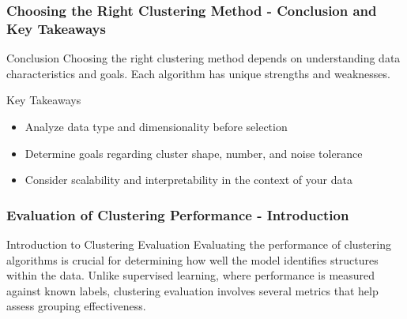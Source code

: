 \documentclass[aspectratio=169]{beamer}
\begin{document}
\begin{frame}[fragile]
    \frametitle{Choosing the Right Clustering Method - Conclusion and Key Takeaways}
    \begin{block}{Conclusion}
        Choosing the right clustering method depends on understanding data characteristics and goals. Each algorithm has unique strengths and weaknesses.
    \end{block}
    
    \begin{block}{Key Takeaways}
        \begin{itemize}
            \item Analyze data type and dimensionality before selection
            \item Determine goals regarding cluster shape, number, and noise tolerance
            \item Consider scalability and interpretability in the context of your data
        \end{itemize}
    \end{block}
\end{frame}

\begin{frame}[fragile]
    \frametitle{Evaluation of Clustering Performance - Introduction}
    \begin{block}{Introduction to Clustering Evaluation}
        Evaluating the performance of clustering algorithms is crucial for determining how well the model identifies structures within the data. 
        Unlike supervised learning, where performance is measured against known labels, clustering evaluation involves several metrics that help assess grouping effectiveness.
    \end{block}
\end{frame}
\end{document}
